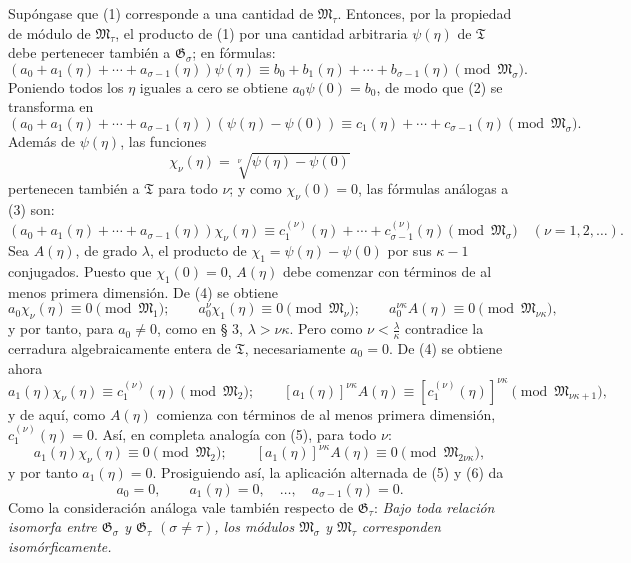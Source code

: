 Supóngase que (1) corresponde a una cantidad de $\mathfrak M_\tau$. Entonces, por la propiedad de módulo de $\mathfrak M_\tau$, el producto de (1) por una cantidad arbitraria $\psi(\eta)$ de $\mathfrak T$ debe pertenecer también a $\mathfrak G_\sigma$; en fórmulas:
\begin{equation}
(a_0+a_1(\eta)+\cdots+a_{\sigma-1}(\eta))\psi(\eta)
\equiv b_0+b_1(\eta)+\cdots+b_{\sigma-1}(\eta)
\pmod{\mathfrak M_\sigma}.
\tag{2}
\end{equation}
Poniendo todos los $\eta$ iguales a cero se obtiene $a_0\psi(0)=b_0$, de modo que (2) se transforma en
\begin{equation}
(a_0+a_1(\eta)+\cdots+a_{\sigma-1}(\eta))(\psi(\eta)-\psi(0))
\equiv c_1(\eta)+\cdots+c_{\sigma-1}(\eta)
\pmod{\mathfrak M_\sigma}.
\tag{3}
\end{equation}
Además de $\psi(\eta)$, las funciones
\[
 \chi_\nu(\eta)=\sqrt[\nu]{\psi(\eta)-\psi(0)}
\]
pertenecen también a $\mathfrak T$ para todo $\nu$; y como $\chi_\nu(0)=0$, las fórmulas análogas a (3) son:
\begin{equation}
(a_0+a_1(\eta)+\cdots+a_{\sigma-1}(\eta))\chi_\nu(\eta)
\equiv c_1^{(\nu)}(\eta)+\cdots+c_{\sigma-1}^{(\nu)}(\eta)
\pmod{\mathfrak M_\sigma}
\quad(\nu=1,2,\ldots).
\tag{4}
\end{equation}
Sea $A(\eta)$, de grado $\lambda$, el producto de $\chi_1=\psi(\eta)-\psi(0)$ por sus $\kappa-1$ conjugados. Puesto que $\chi_1(0)=0$, $A(\eta)$ debe comenzar con términos de al menos primera dimensión. De (4) se obtiene
\begin{equation}
a_0\chi_\nu(\eta)\equiv0\pmod{\mathfrak M_1};\qquad
 a_0^\nu\chi_1(\eta)\equiv0\pmod{\mathfrak M_\nu};\qquad
 a_0^{\nu\kappa}A(\eta)\equiv0\pmod{\mathfrak M_{\nu\kappa}},
\tag{5}
\end{equation}
y por tanto, para $a_0\ne0$, como en § 3, $\lambda>\nu\kappa$. Pero como $\nu<\frac{\lambda}{\kappa}$ contradice la cerradura algebraicamente entera de $\mathfrak T$, necesariamente $a_0=0$. De (4) se obtiene ahora
\begin{equation}
a_1(\eta)\chi_\nu(\eta)\equiv c_1^{(\nu)}(\eta)\pmod{\mathfrak M_2};\qquad
[a_1(\eta)]^{\nu\kappa}A(\eta)
\equiv[c_1^{(\nu)}(\eta)]^{\nu\kappa}\pmod{\mathfrak M_{\nu\kappa+1}},
\tag{6}
\end{equation}
y de aquí, como $A(\eta)$ comienza con términos de al menos primera dimensión, $c_1^{(\nu)}(\eta)=0$. Así, en completa analogía con (5), para todo $\nu$:
\[
 a_1(\eta)\chi_\nu(\eta)\equiv0\pmod{\mathfrak M_2};\qquad
 [a_1(\eta)]^{\nu\kappa}A(\eta)\equiv0\pmod{\mathfrak M_{2\nu\kappa}},
\]
y por tanto $a_1(\eta)=0$. Prosiguiendo así, la aplicación alternada de (5) y (6) da
\[
 a_0=0,\qquad a_1(\eta)=0,\quad \ldots,\quad a_{\sigma-1}(\eta)=0.
\]
Como la consideración análoga vale también respecto de $\mathfrak G_\tau$: \emph{Bajo toda relación isomorfa entre $\mathfrak G_\sigma$ y $\mathfrak G_\tau$ $(\sigma\ne\tau)$, los módulos $\mathfrak M_\sigma$ y $\mathfrak M_\tau$ corresponden isomórficamente.}

